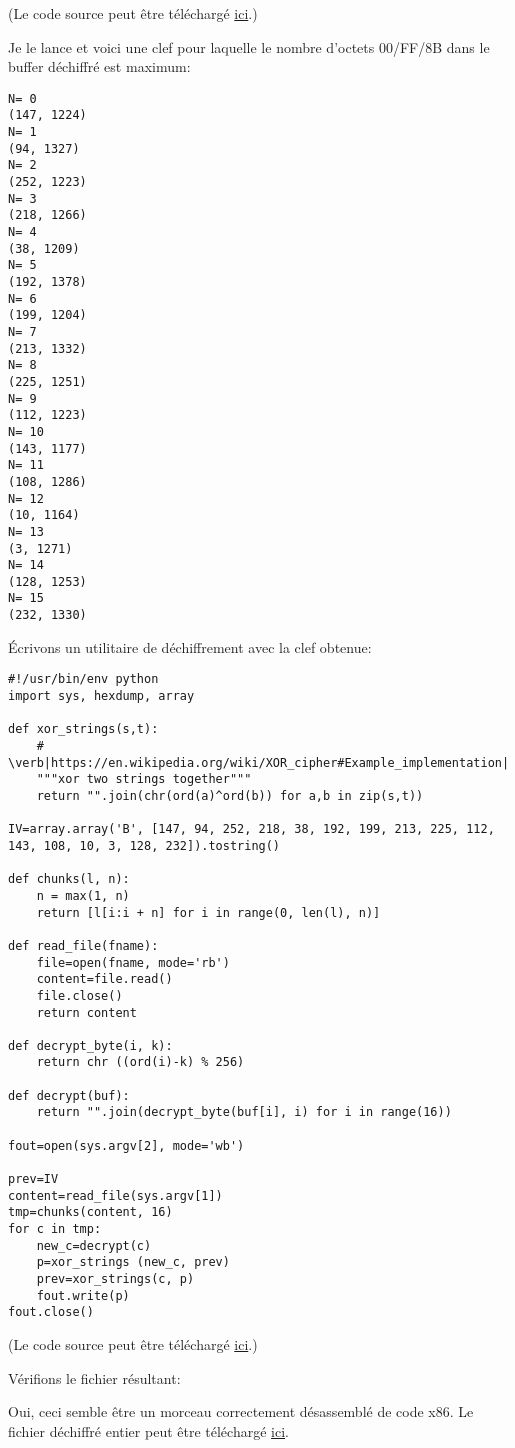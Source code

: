 (Le code source peut être téléchargé
\href{\GitHubBlobMasterURL/examples/simple_exec_crypto/files/decrypt.py}{ici}.)

Je le lance et voici une clef pour laquelle le nombre d'octets 00/FF/8B dans le buffer
déchiffré est maximum:

\begin{lstlisting}
N= 0
(147, 1224)
N= 1
(94, 1327)
N= 2
(252, 1223)
N= 3
(218, 1266)
N= 4
(38, 1209)
N= 5
(192, 1378)
N= 6
(199, 1204)
N= 7
(213, 1332)
N= 8
(225, 1251)
N= 9
(112, 1223)
N= 10
(143, 1177)
N= 11
(108, 1286)
N= 12
(10, 1164)
N= 13
(3, 1271)
N= 14
(128, 1253)
N= 15
(232, 1330)
\end{lstlisting}

Écrivons un utilitaire de déchiffrement avec la clef obtenue:

\begin{lstlisting}[style=custompy]
#!/usr/bin/env python
import sys, hexdump, array

def xor_strings(s,t):
    # \verb|https://en.wikipedia.org/wiki/XOR_cipher#Example_implementation|
    """xor two strings together"""
    return "".join(chr(ord(a)^ord(b)) for a,b in zip(s,t))

IV=array.array('B', [147, 94, 252, 218, 38, 192, 199, 213, 225, 112, 143, 108, 10, 3, 128, 232]).tostring()

def chunks(l, n):
    n = max(1, n)
    return [l[i:i + n] for i in range(0, len(l), n)]

def read_file(fname):
    file=open(fname, mode='rb')
    content=file.read()
    file.close()
    return content

def decrypt_byte(i, k):
    return chr ((ord(i)-k) % 256)

def decrypt(buf):
    return "".join(decrypt_byte(buf[i], i) for i in range(16))

fout=open(sys.argv[2], mode='wb')

prev=IV
content=read_file(sys.argv[1])
tmp=chunks(content, 16)
for c in tmp:
    new_c=decrypt(c)
    p=xor_strings (new_c, prev)
    prev=xor_strings(c, p)
    fout.write(p)
fout.close()
\end{lstlisting}

(Le code source peut être téléchargé
\href{\GitHubBlobMasterURL/examples/simple_exec_crypto/files/decrypt2.py}
{ici}.)

Vérifions le fichier résultant:



Oui, ceci semble être un morceau correctement désassemblé de code x86.
Le fichier déchiffré entier peut être téléchargé
\href{\GitHubBlobMasterURL/examples/simple_exec_crypto/files/decrypted.bin}{ici}.

